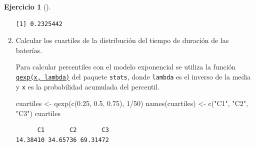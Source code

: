 \documentclass[
  a4paper,
]{scrreport}
\newenvironment{Shaded}{\begin{snugshade}}{\end{snugshade}}
\newcommand{\DecValTok}[1]{\textcolor[rgb]{0.68,0.00,0.00}{#1}}
\newcommand{\FloatTok}[1]{\textcolor[rgb]{0.68,0.00,0.00}{#1}}
\newcommand{\FunctionTok}[1]{\textcolor[rgb]{0.28,0.35,0.67}{#1}}
\newcommand{\NormalTok}[1]{\textcolor[rgb]{0.00,0.23,0.31}{#1}}
\newcommand{\OtherTok}[1]{\textcolor[rgb]{0.00,0.23,0.31}{#1}}
\newcommand{\SpecialCharTok}[1]{\textcolor[rgb]{0.37,0.37,0.37}{#1}}
\newcommand{\StringTok}[1]{\textcolor[rgb]{0.13,0.47,0.30}{#1}}
\theoremstyle{definition}
\newtheorem{exercise}{Ejercicio}[chapter]
\theoremstyle{remark}
\begin{document}
\begin{exercise}[]
\begin{enumerate}
\begin{tcolorbox}
\begin{verbatim}
[1] 0.2325442
\end{verbatim}

  \end{tcolorbox}
\item
  Calcular los cuartiles de la distribución del tiempo de duración de
  las baterías.

  \begin{tcolorbox}[enhanced jigsaw, coltitle=black, left=2mm, colback=white, leftrule=.75mm, toptitle=1mm, breakable, bottomrule=.15mm, titlerule=0mm, bottomtitle=1mm, title=\textcolor{quarto-callout-tip-color}{\faLightbulb}\hspace{0.5em}{Solución}, arc=.35mm, toprule=.15mm, rightrule=.15mm, colframe=quarto-callout-tip-color-frame, opacityback=0, colbacktitle=quarto-callout-tip-color!10!white, opacitybacktitle=0.6]

  Para calcular percentiles con el modelo exponencial se utiliza la
  función
  \href{https://www.rdocumentation.org/packages/stats/versions/3.3/topics/Exponential}{\texttt{qexp(x,\ lambda)}}
  del paquete \texttt{stats}, donde \texttt{lambda} es el inverso de la
  media y \texttt{x} es la probabilidad acumulada del percentil.

\begin{Shaded}
\begin{Highlighting}[]
\NormalTok{cuartiles }\OtherTok{\textless{}{-}} \FunctionTok{qexp}\NormalTok{(}\FunctionTok{c}\NormalTok{(}\FloatTok{0.25}\NormalTok{, }\FloatTok{0.5}\NormalTok{, }\FloatTok{0.75}\NormalTok{), }\DecValTok{1}\SpecialCharTok{/}\DecValTok{50}\NormalTok{)}
\FunctionTok{names}\NormalTok{(cuartiles) }\OtherTok{\textless{}{-}} \FunctionTok{c}\NormalTok{(}\StringTok{"C1"}\NormalTok{, }\StringTok{"C2"}\NormalTok{, }\StringTok{"C3"}\NormalTok{)}
\NormalTok{cuartiles}
\end{Highlighting}
\end{Shaded}

\begin{verbatim}
      C1       C2       C3 
14.38410 34.65736 69.31472 
\end{verbatim}

  \end{tcolorbox}
\end{enumerate}

\end{exercise}
\end{document}
